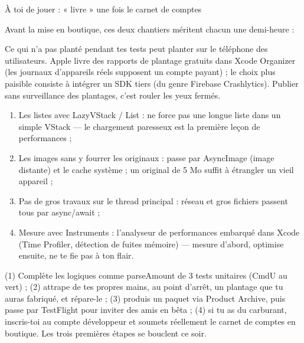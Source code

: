 \begin{tcbpractice}{À toi de jouer : « livre » une fois le carnet de comptes}

Avant la mise en boutique, ces deux chantiers méritent chacun une demi-heure :


Ce qui n'a pas planté pendant tes tests peut planter sur le téléphone des utilisateurs. Apple livre des rapports de plantage gratuits dans Xcode Organizer (les journaux d'appareils réels supposent un compte payant) ; le choix plus paisible consiste à intégrer un SDK tiers (du genre Firebase Crashlytics). Publier sans surveillance des plantages, c'est rouler les yeux fermés.


\begin{enumerate}
  \item Les listes avec LazyVStack / List : ne force pas une longue liste dans un simple VStack — le chargement paresseux est la première leçon de performances ;
  \item Les images sans y fourrer les originaux : passe par AsyncImage (image distante) et le cache système ; un original de 5 Mo suffit à étrangler un vieil appareil ;
  \item Pas de gros travaux sur le thread principal : réseau et gros fichiers passent tous par async/await ;
  \item Mesure avec Instruments : l'analyseur de performances embarqué dans Xcode (Time Profiler, détection de fuites mémoire) — mesure d'abord, optimise ensuite, ne te fie pas à ton flair.
\end{enumerate}

(1) Complète les logiques comme parseAmount de 3 tests unitaires (CmdU au vert) ; (2) attrape de tes propres mains, au point d'arrêt, un plantage que tu auras fabriqué, et répare-le ; (3) produis un paquet via Product Archive, puis passe par TestFlight pour inviter des amis en bêta ; (4) si tu as du carburant, inscris-toi au compte développeur et soumets réellement le carnet de comptes en boutique. Les trois premières étapes se bouclent ce soir.

\end{tcbpractice}

